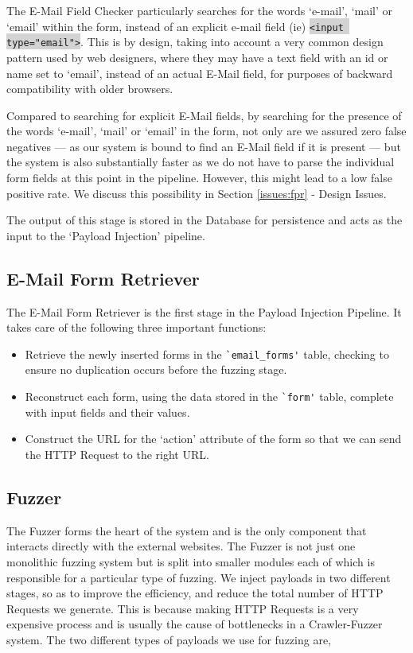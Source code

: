 The E-Mail Field Checker particularly searches for the words `e-mail', `mail' or `email' within the form, instead of an explicit e-mail field (ie) \colorbox{lightgray}{\lstinline{<input type="email">}}. This is by design, taking into account a very common design pattern used by web designers, where they may have a text field with an id or name set to `email', instead of an actual E-Mail field, for purposes of backward compatibility with older browsers.

Compared to searching for explicit E-Mail fields, by searching for the presence of the words `e-mail', `mail' or `email' in the form, not only are we assured zero false negatives --- as our system is bound to find an E-Mail field if it is present --- but the system is also substantially faster as we do not have to parse the individual form fields at this point in the pipeline. However, this might lead to a low false positive rate. We discuss this possibility in Section \ref*{issues:fpr} - Design Issues. 

The output of this stage is stored in the Database for persistence and acts as the input to the `Payload Injection' pipeline.


\subsection{E-Mail Form Retriever}
\label{Comp:EMFR}
The E-Mail Form Retriever is the first stage in the Payload Injection Pipeline. It takes care of the following three important functions:
\begin{itemize}
	\item Retrieve the newly inserted forms in the \lstinline{`email_forms'} table, checking to ensure no duplication occurs before the fuzzing stage.
	\item Reconstruct each form, using the data stored in the \lstinline{`form'} table, complete with input fields and their values.
	\item Construct the URL for the `action' attribute of the form so that we can send the HTTP Request to the right URL. 
\end{itemize}

\subsection{Fuzzer}
\label{Comp:Fuzzer}
The Fuzzer forms the heart of the system and is the only component that interacts directly with the external websites. The Fuzzer is not just one monolithic fuzzing system but is split into smaller modules each of which is responsible for a particular type of fuzzing.  We inject payloads in two different stages, so as to improve the efficiency, and reduce the total number of HTTP Requests we generate. This is because making HTTP Requests is a very expensive process and is usually the cause of bottlenecks in a Crawler-Fuzzer system.
The two different types of payloads we use for fuzzing are,
